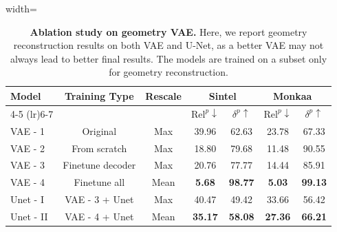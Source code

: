 \begin{table}[t]
\centering
\caption{
\textbf{Ablation study on geometry VAE.}
Here,
we report geometry reconstruction results on both VAE and U-Net,
as a better VAE may not always lead to better final results.
The models are trained on a subset only for geometry reconstruction.
}
\label{tab:ablation_geometry}
\vspace{-0.5em}
\begin{adjustbox}{width=\linewidth}
\begin{tabular}{@{}l cc cc cc@{}}
\toprule
\multirow{2}{*}{\textbf{Model}} & 
\multirow{2}{*}{\textbf{Training Type}} & 
\multirow{2}{*}{\textbf{Rescale}} & 
\multicolumn{2}{c}{\textbf{Sintel}\cite{sintel}} &
\multicolumn{2}{c}{\textbf{Monkaa}~\cite{mayer2016large}} \\
\cmidrule(lr){4-5} \cmidrule(lr){6-7}
& & &
$\text{Rel}^{p}\!\downarrow$ & $\delta^{p}\!\uparrow$ &
$\text{Rel}^{p}\!\downarrow$ & $\delta^{p}\!\uparrow$ \\
\midrule
VAE - 1 & Original  & Max &
39.96 & 62.63 &
23.78 & 67.33 \\

VAE - 2 & From scratch & Max &
18.80 & 79.68 &
11.48 & 90.55 \\

VAE - 3  & Finetune decoder & Max &
20.76 & 77.77 &
14.44 & 85.91 \\

VAE - 4 & Finetune all & Mean &
\textbf{5.68} & \textbf{98.77} &
\textbf{5.03} & \textbf{99.13} \\

\midrule
Unet - I & VAE - 3 + Unet & Max &  40.47 & 49.42 & 33.66 & 56.42  \\
Unet - II & VAE - 4 + Unet & Mean &  \textbf{35.17} & \textbf{58.08} & \textbf{27.36} & \textbf{66.21} \\

\bottomrule
\end{tabular}
\end{adjustbox}
\vspace{-0.5em}
\end{table}

